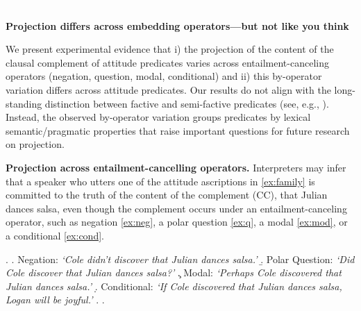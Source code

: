 \documentclass[12pt, a4paper]{scrartcl}
\begin{document}

\textcolor{white}{.} \vspace{-3.9\baselineskip} \\
\begin{center}
	\textbf{\large%
		Projection differs across embedding operators---but not like you think}
\end{center}

\vspace*{-.4cm}

\noindent 
We present experimental evidence that i) the projection of the content of the clausal complement of attitude predicates varies across entailment-canceling operators (negation, question, modal, conditional) and ii) this by-operator variation differs across attitude predicates. Our results do not align with the long-standing distinction between factive and semi-factive predicates (see, e.g., \citealt{karttunen_observations_1971,djarv_cognitive_2018}). Instead, the observed by-operator variation groups predicates by lexical semantic/pragmatic properties that raise important questions for future research on projection.

\noindent
{\bf Projection across entailment-cancelling operators.} Interpreters may infer that a speaker who utters one of the attitude ascriptions in  \ref{ex:family} is committed to the truth of the content of the complement (CC), that Julian dances salsa, even though the complement occurs under an entailment-canceling operator, such as negation \ref{ex:neg}, a polar question \ref{ex:q}, a modal \ref{ex:mod}, or a conditional \ref{ex:cond}.


	\vspace{-.3\baselineskip}
	\ex. \label{ex:family}
		\a. \label{ex:neg}
			Negation: \hfill
			\emph{\lq Cole didn't discover that Julian dances salsa.\rq}
		\b. \label{ex:q}
			Polar Question: \hfill
			\emph{\lq Did Cole discover that Julian dances salsa?\rq}
		\c. \label{ex:mod}
			Modal: \hfill
			\emph{\lq Perhaps Cole discovered that Julian dances salsa.\rq}
		\d. \label{ex:cond}
			Conditional: \hfill
			\emph{\lq If Cole discovered that Julian dances salsa, Logan will be joyful.\rq}
		\z.
	\z.
\end{document}
